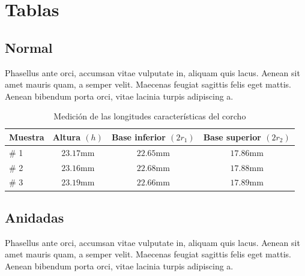 \documentclass[colTwo]{NanouparIEEE}
\begin{document}
    \section{Tablas}

        \subsection{Normal}
            Phasellus ante orci, accumsan vitae vulputate in, aliquam quis lacus. Aenean sit amet mauris quam, a semper velit. Maecenas feugiat sagittis felis eget mattis. Aenean bibendum porta orci, vitae lacinia turpis adipiscing a. 

            \begin{table}[ht!]
                \caption{Medición de las longitudes características del corcho}
                \begin{center}
                    \begin{tabular}{l|c|c|c}
                        Muestra & Altura $(h)$ & Base inferior $(2r_1)$ & Base superior $(2r_2)$ \\
                        \hline \hline 
                        \# 1 & $23.17 \mathrm{mm}$ & $22.65 \mathrm{mm}$ & $17.86 \mathrm{mm}$\\
                        \hline 
                        \# 2 & $23.16 \mathrm{mm}$ & $22.68 \mathrm{mm}$ & $17.88 \mathrm{mm}$\\
                        \hline 
                        \# 3 & $23.19 \mathrm{mm}$ & $22.66 \mathrm{mm}$ & $17.89 \mathrm{mm}$\\
                        \hline
                        \end{tabular}
                \end{center}
                \label{medicion_longitudes_corcho}
            \end{table}

        \subsection{Anidadas}
            Phasellus ante orci, accumsan vitae vulputate in, aliquam quis lacus. Aenean sit amet mauris quam, a semper velit. Maecenas feugiat sagittis felis eget mattis. Aenean bibendum porta orci, vitae lacinia turpis adipiscing a. 
            
\end{document}
